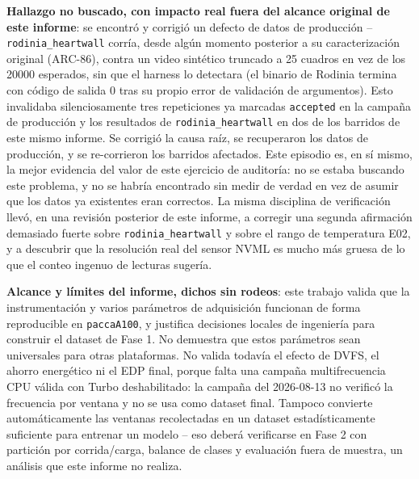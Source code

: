 \textbf{Hallazgo no buscado, con impacto real fuera del alcance original
de este informe}: se encontró y corrigió un defecto de datos de producción
-- \texttt{rodinia\_heartwall} corría, desde algún momento posterior a su
caracterización original (ARC-86), contra un video sintético truncado a 25
cuadros en vez de los 20000 esperados, sin que el harness lo detectara
(el binario de Rodinia termina con código de salida 0 tras su propio error
de validación de argumentos). Esto invalidaba silenciosamente tres
repeticiones ya marcadas \texttt{accepted} en la campaña de producción y
los resultados de \texttt{rodinia\_heartwall} en dos de los barridos de
este mismo informe. Se corrigió la causa raíz, se recuperaron los datos de
producción, y se re-corrieron los barridos afectados. Este episodio es, en
sí mismo, la mejor evidencia del valor de este ejercicio de auditoría: no
se estaba buscando este problema, y no se habría encontrado sin medir de
verdad en vez de asumir que los datos ya existentes eran correctos. La
misma disciplina de verificación llevó, en una revisión posterior de este
informe, a corregir una segunda afirmación demasiado fuerte sobre
\texttt{rodinia\_heartwall} y sobre el rango de temperatura E02, y a
descubrir que la resolución real del sensor NVML es mucho más gruesa de lo
que el conteo ingenuo de lecturas sugería.

\textbf{Alcance y límites del informe, dichos sin rodeos}: este trabajo
valida que la instrumentación y varios parámetros de adquisición funcionan
de forma reproducible en \texttt{paccaA100}, y justifica decisiones
locales de ingeniería para construir el dataset de Fase 1. No demuestra
que estos parámetros sean universales para otras plataformas. No valida
todavía el efecto de DVFS, el ahorro energético ni el EDP final, porque
falta una campaña multifrecuencia CPU válida con Turbo deshabilitado: la
campaña del 2026-08-13 no verificó la frecuencia por ventana y no se usa
como dataset final. Tampoco convierte automáticamente las ventanas recolectadas en un
dataset estadísticamente suficiente para entrenar un modelo -- eso deberá
verificarse en Fase 2 con partición por corrida/carga, balance de clases y
evaluación fuera de muestra, un análisis que este informe no realiza.

